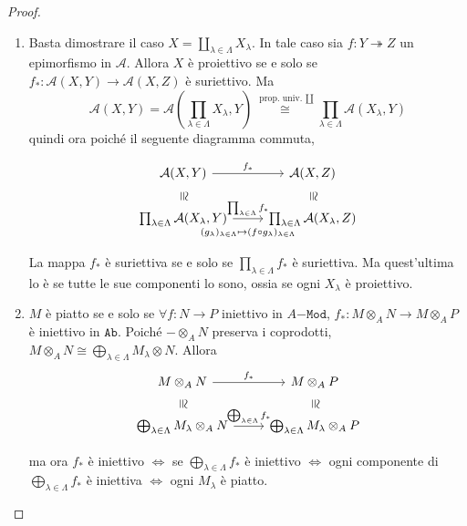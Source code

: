 \begin{proof}{} \( \) 
\begin{enumerate}[label = \arabic*.]
    \item Basta dimostrare il caso \(X = \coprod_{\lambda \in \Lambda}
        X_\lambda\). In tale caso sia \(f : Y \twoheadrightarrow Z\) un
        epimorfismo in \(\mathcal{A}\). Allora \(X\) è proiettivo se e solo se
        \(f_* : \mathcal{A}{(X, Y)} \to \mathcal{A}{(X, Z)}\) è suriettivo. Ma
        \[
          \mathcal{A}{(X, Y)} = \mathcal{A}{\left( \prod_{\lambda \in \Lambda}
          X_\lambda, Y \right)} \overset{\text{ prop. univ. \(\coprod\)}}{\cong}
          \prod_{\lambda \in \Lambda} \mathcal{A}{(X_\lambda, Y)}
        \]
        quindi ora poiché il seguente diagramma commuta, 

\[\begin{tikzcd}
	\mathcal{A}{(X, Y)} & \mathcal{A}{(X, Z)} \\
	\prod_{\lambda \in \Lambda} \mathcal{A}{(X_\lambda, Y)} & \prod_{\lambda \in \Lambda} \mathcal{A}{(X_\lambda, Z)}
	\arrow["{f_*}", from=1-1, to=1-2]
	\arrow["\cong"{marking, allow upside down}, draw=none, from=1-1, to=2-1]
	\arrow["\cong"{marking, allow upside down}, draw=none, from=1-2, to=2-2]
	\arrow["{\prod_{\lambda \in \Lambda}f_*}", from=2-1, to=2-2]
	\arrow["{(g_\lambda)_{\lambda \in \Lambda} \mapsto (f \circ g_\lambda)_{\lambda \in \Lambda}}"', shift right=2, draw=none, from=2-1, to=2-2]
\end{tikzcd}\]

        La mappa \(f_*\) è suriettiva se e solo se \(\prod_{\lambda \in \Lambda}
        f_*\) è suriettiva. Ma quest'ultima lo è se tutte le sue componenti lo
        sono, ossia se ogni \(X_\lambda\) è proiettivo.
    \item \(M\) è piatto se e solo se \(\forall f : N \to P\) iniettivo in
        \(A\mathtt{-Mod}\), \(f_* : M \otimes_A N \to M \otimes_A P\) è
        iniettivo in \(\mathtt{Ab}\). Poiché \(- \otimes_A N\) preserva i
        coprodotti, \(M \otimes_A N \cong \bigoplus_{\lambda \in \Lambda} M_\lambda
        \otimes N\). Allora
\[\begin{tikzcd}
	M \otimes_A N & M \otimes_A P \\
	\bigoplus_{\lambda \in \Lambda} M_{\lambda} \otimes_A N & \bigoplus_{\lambda \in \Lambda} M_\lambda \otimes_A P
	\arrow["{f_*}", from=1-1, to=1-2]
	\arrow["\cong"{marking, allow upside down}, draw=none, from=1-1, to=2-1]
	\arrow["\cong"{marking, allow upside down}, draw=none, from=1-2, to=2-2]
	\arrow["{\bigoplus_{\lambda \in \Lambda}f_*}", from=2-1, to=2-2]
\end{tikzcd}\]

    ma ora \(f_*\) è iniettivo \(\iff\) se \(\bigoplus_{\lambda \in \Lambda}
    f_*\) è iniettivo \(\iff\) ogni componente di \(\bigoplus_{\lambda \in
    \Lambda} f_* \) è iniettiva \(\iff\) ogni \(M_\lambda\) è piatto.
\end{enumerate}
\end{proof}

